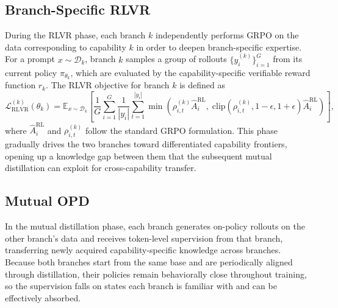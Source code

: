 \subsection{Branch-Specific RLVR}
\label{sec:rlvr}
During the RLVR phase, each branch $k$ independently performs GRPO on the data corresponding to capability $k$ in order to deepen branch-specific expertise. For a prompt $x \sim \mathcal{D}_k$, branch $k$ samples a group of rollouts $\{y_i^{(k)}\}_{i=1}^{G}$ from its current policy $\pi_{\theta_k}$, which are evaluated by the capability-specific verifiable reward function $r_k$. The RLVR objective for branch $k$ is defined as
\begin{equation}
\label{eq:rlvr}
\mathcal{L}_{\mathrm{RLVR}}^{(k)}(\theta_k)
=
\mathbb{E}_{x \sim \mathcal{D}_k}
\left[
\frac{1}{G}\sum_{i=1}^{G}\frac{1}{|y_i|}
\sum_{t=1}^{|y_i|}
\min\!\left(
\rho_{i,t}^{(k)} \hat{A}_i^{\mathrm{RL}},
\;
\mathrm{clip}\!\left(\rho_{i,t}^{(k)}, 1-\epsilon, 1+\epsilon\right)\hat{A}_i^{\mathrm{RL}}
\right)
\right],
\end{equation}
where $\hat{A}_i^{\mathrm{RL}}$ and $\rho_{i,t}^{(k)}$ follow the standard GRPO formulation. 
This phase gradually drives the two branches toward differentiated capability frontiers, opening up a knowledge gap between them that the subsequent mutual distillation can exploit for cross-capability transfer.

\subsection{Mutual OPD}
\label{sec:opd}
In the mutual distillation phase, each branch generates on-policy rollouts on the other branch's data and receives token-level supervision from that branch, transferring newly acquired capability-specific knowledge across branches. Because both branches start from the same base and are periodically aligned through distillation, their policies remain behaviorally close throughout training, so the supervision falls on states each branch is familiar with and can be effectively absorbed.


